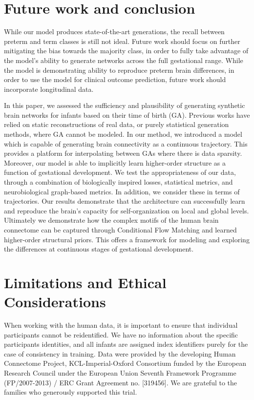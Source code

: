 \documentclass[sigconf, review]{acmart}
\begin{document}
\section{Future work and conclusion}
While our model produces state-of-the-art generations, the recall between preterm and term classes is still not ideal. Future work should focus on further mitigating the bias towards the majority class, in order to fully take advantage of the model's ability to generate networks across the full gestational range. While the model is demonstrating ability to reproduce preterm brain differences, in order to use the model for clinical outcome prediction, future work should incorporate longitudinal data.

In this paper, we assessed the sufficiency and plausibility of generating synthetic brain networks for infants based on their time of birth (GA). Previous works have relied on static reconstructions of real data, or purely statistical generation methods, where GA cannot be modeled. In our method, we introduced a model which is capable of generating brain connectivity as a continuous trajectory. This provides a platform for interpolating between GAs where there is data sparsity. 
Moreover, our model is able to implicitly learn higher-order structure as a function of gestational development. We test the appropriateness of our data, through a combination of biologically inspired losses, statistical metrics, and neurobiological graph-based metrics. In addition, we consider these in terms of trajectories. Our results demonstrate that the architecture can successfully learn and reproduce the brain's capacity for self-organization on local and global levels. Ultimately we demonstrate how the complex motifs of the human brain connectome can be captured through Conditional Flow Matching and learned higher-order structural priors. This offers a framework for modeling and exploring the differences at continuous stages of gestational development.


\section{Limitations and Ethical Considerations}
When working with the human data, it is important to ensure that individual participants cannot be reidentified. We have no information about the specific participants identities, and all infants are assigned index identifiers purely for the case of consistency in training. 
 Data were provided by the developing Human Connectome Project, KCL-Imperial-Oxford Consortium funded by the European Research Council under the European Union Seventh Framework Programme (FP/2007-2013) / ERC Grant Agreement no. [319456]. We are grateful to the families who generously supported this trial.
\end{document}

